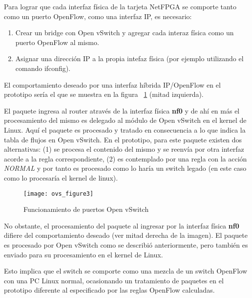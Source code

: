 \begin{enumerate}
Para lograr que cada interfaz f\'isica de la tarjeta NetFPGA se comporte tanto como un puerto OpenFlow, como una interfaz IP, es necesario:

\begin{enumerate}
\item Crear un bridge con Open vSwitch y agregar cada interaz f\'isica como un puerto OpenFlow al mismo.
\item Asignar una dirección IP a la propia intefaz f\'isica (por ejemplo utilizando el comando ifconfig).
\end{enumerate}


El comportamiento deseado por una interfaz h\'ibrida IP/OpenFlow en el prototipo ser\'ia el que se muestra en la figura ~\ref{fig:OVSInterfaces} (mitad izquierda).

El paquete ingresa al router atrav\'es de la interfaz f\'isica \textbf{nf0} y de ah\'i en m\'as el procesamiento del mismo es delegado al m\'odulo de Open vSwitch en el kernel de Linux. Aqu\'i el paquete es procesado y tratado en consecuencia a lo que indica la tabla de flujos en Open vSwitch. En el prototipo, para este paquete existen dos alternativas: (1) se procesa el contenido del mismo y se reenv\'ia por otra interfaz acorde a la regla correspondiente, (2) es contemplado por una regla con la acci\'on \textit{NORMAL} y por tanto es procesado como lo har\'ia un switch legado (en este caso como lo procesar\'ia el kernel de linux).\\

\begin{figure}[h!] 
\centering    
\texttt{[image: ovs\_figure3]}
\caption[Funcionamiento de puertos Open vSwitch]{Funcionamiento de puertos Open vSwitch}
\label{fig:OVSInterfaces}
\end{figure}

No obstante, el procesamiento del paquete al ingresar por la interfaz f\'isica \textbf{nf0} difiere del comportamiento deseado (ver mitad derecha de la imagen). El paquete es procesado por Open vSwitch como se describi\'o anteriormente, pero tambi\'en es enviado para su procesamiento en el kernel de Linux.

Esto implica que el switch se comporte como una mezcla de un switch OpenFlow  con una PC Linux normal, ocasionando un tratamiento de paquetes en el prototipo diferente al especificado por las reglas OpenFlow calculadas.\\


\end{enumerate}
